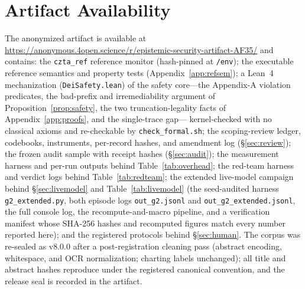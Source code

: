 \documentclass[conference]{IEEEtran}
\begin{document}
\section*{Artifact Availability}
The anonymized artifact is available at \url{https://anonymous.4open.science/r/epistemic-security-artifact-AF35/} and
contains: the
\texttt{czta\_ref} reference monitor (hash-pinned at
\texttt{/env}); the executable reference semantics and property
tests (Appendix~\ref{app:refsem}); a Lean~4 mechanization
(\texttt{DeiSafety.lean}) of the safety core---the Appendix-A
violation predicates, the bad-prefix and irremediability argument
of Proposition~\ref{prop:safety}, the two truncation-legality
facts of Appendix~\ref{app:proofs}, and the single-trace gap---%
kernel-checked with no classical axioms and re-checkable by
\texttt{check\_formal.sh}; the scoping-review ledger,
codebooks, instruments, per-record hashes, and amendment log
(\S\ref{sec:review}); the frozen audit sample with receipt hashes
(\S\ref{sec:audit}); the measurement harness and per-run outputs
behind Table~\ref{tab:overhead}; the red-team harness and verdict
logs behind Table~\ref{tab:redteam}; the extended live-model
campaign behind \S\ref{sec:livemodel} and Table~\ref{tab:livemodel}
(the seed-audited harness \texttt{g2\_extended.py}, both episode
logs \texttt{out\_g2.jsonl} and \texttt{out\_g2\_extended.jsonl},
the full console log, the recompute-and-macro pipeline, and a
verification manifest whose SHA-256 hashes and recomputed figures
match every number reported here); and the registered protocols
behind \S\ref{sec:human}. The corpus was re-sealed as v8.0.0
after a post-registration cleaning pass (abstract encoding,
whitespace, and OCR normalization; charting labels unchanged); all
title and abstract hashes reproduce under the registered canonical
convention, and the release seal is recorded in the artifact.
\end{document}

